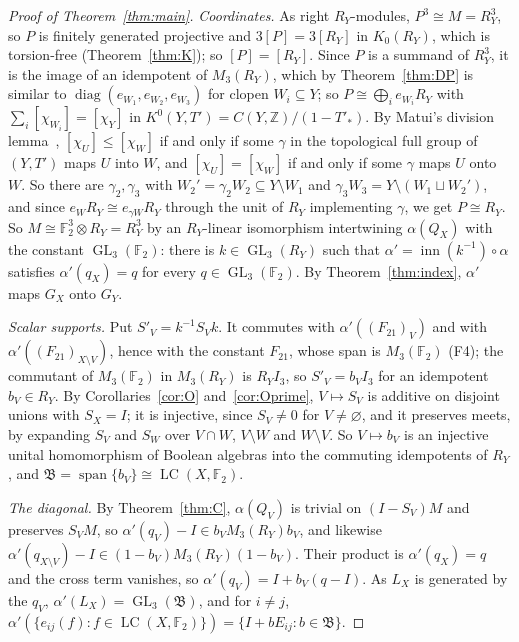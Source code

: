 \documentclass[11pt]{amsart}
\theoremstyle{remark}
\newcommand{\F}{\mathbb F}
\newcommand{\Z}{\mathbb Z}
\newcommand{\LC}{\operatorname{LC}}
\newcommand{\GL}{\operatorname{GL}}
\newcommand{\inn}{\operatorname{inn}}
\begin{document}
\begin{proof}[Proof of Theorem~\ref{thm:main}]
\emph{Coordinates.} As right $R_Y$-modules, $P^3\cong M=R_Y^3$, so $P$ is
finitely generated projective and $3[P]=3[R_Y]$ in $K_0(R_Y)$, which is
torsion-free (Theorem~\ref{thm:K}); so $[P]=[R_Y]$. Since $P$ is a summand
of $R_Y^3$, it is the image of an idempotent of $M_3(R_Y)$, which by
Theorem~\ref{thm:DP} is similar to $\operatorname{diag}(e_{W_1},e_{W_2},e_{W_3})$
for clopen $W_i\subseteq Y$; so $P\cong\bigoplus_ie_{W_i}R_Y$ with
$\sum_i[\chi_{W_i}]=[\chi_Y]$ in $K^0(Y,T')=C(Y,\Z)/(1-T'_*)$. By
Matui's division lemma~\cite[Lemma~2.5]{Matui05}, $[\chi_U]\le[\chi_W]$
if and only if some $\gamma$ in the topological full group of $(Y,T')$
maps $U$ into $W$, and $[\chi_U]=[\chi_W]$ if and only if some $\gamma$
maps $U$ onto $W$. So there are $\gamma_2,\gamma_3$ with
$W_2'=\gamma_2W_2\subseteq Y\setminus W_1$ and
$\gamma_3W_3=Y\setminus(W_1\sqcup W_2')$, and since
$e_WR_Y\cong e_{\gamma W}R_Y$ through the unit of $R_Y$ implementing
$\gamma$, we get $P\cong R_Y$. So $M\cong\F_2^3\otimes R_Y=R_Y^3$ by an
$R_Y$-linear isomorphism intertwining $\alpha(Q_X)$ with the constant
$\GL_3(\F_2)$: there is $k\in\GL_3(R_Y)$ such that
$\alpha'=\inn(k^{-1})\circ\alpha$ satisfies $\alpha'(q_X)=q$ for every
$q\in\GL_3(\F_2)$. By Theorem~\ref{thm:index}, $\alpha'$ maps $G_X$ onto
$G_Y$.

\emph{Scalar supports.} Put $S'_V=k^{-1}S_Vk$. It commutes with
$\alpha'((F_{21})_V)$ and with $\alpha'((F_{21})_{X\setminus V})$, hence
with the constant $F_{21}$, whose span is $M_3(\F_2)$ (F4); the commutant
of $M_3(\F_2)$ in $M_3(R_Y)$ is $R_YI_3$, so $S'_V=b_VI_3$ for an idempotent
$b_V\in R_Y$. By Corollaries~\ref{cor:O} and~\ref{cor:Oprime},
$V\mapsto S_V$ is additive on disjoint unions with $S_X=I$; it is injective,
since $S_V\ne0$ for $V\ne\varnothing$, and it preserves meets, by
expanding $S_V$ and $S_W$ over $V\cap W$, $V\setminus W$ and $W\setminus V$.
So $V\mapsto b_V$ is an injective unital homomorphism of Boolean algebras
into the commuting idempotents of $R_Y$, and
$\mathfrak B=\operatorname{span}\{b_V\}\cong\LC(X,\F_2)$.

\emph{The diagonal.} By Theorem~\ref{thm:C}, $\alpha(Q_V)$ is trivial on
$(I-S_V)M$ and preserves $S_VM$, so
$\alpha'(q_V)-I\in b_VM_3(R_Y)b_V$, and likewise
$\alpha'(q_{X\setminus V})-I\in(1-b_V)M_3(R_Y)(1-b_V)$. Their product is
$\alpha'(q_X)=q$ and the cross term vanishes, so
$\alpha'(q_V)=I+b_V(q-I)$. As $L_X$ is generated by the $q_V$,
$\alpha'(L_X)=\GL_3(\mathfrak B)$, and for $i\ne j$,
$\alpha'(\{e_{ij}(f):f\in\LC(X,\F_2)\})=\{I+bE_{ij}:b\in\mathfrak B\}$.


\end{proof}
\end{document}
